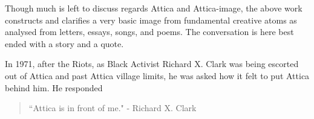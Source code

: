 \documentclass[14pt, letterpaper]{report}
\begin{document}
	Though much is left to discuss regards Attica and Attica-image, 
	the above work constructs and clarifies a very basic image from 
	fundamental creative atoms as analysed from letters, essays, songs, 
	and poems. The conversation is here best ended with a story and a quote.
	
	In 1971, after the Riots, as Black Activist Richard X. Clark was 
	being escorted out of Attica and past Attica village limits, he 
	was asked how it felt to put Attica behind him. He responded 
	
	\begin{quote}
	
		``Attica is in front of me." - 	Richard X. Clark
	
	\end{quote}
	
%	
%
%	
%		
%				
%					
\end{document}
